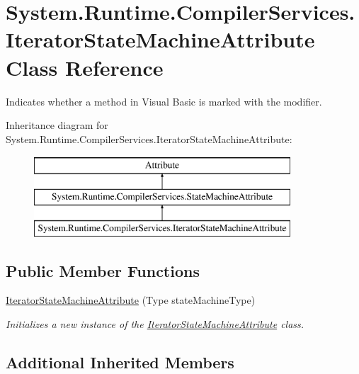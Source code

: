 \hypertarget{class_system_1_1_runtime_1_1_compiler_services_1_1_iterator_state_machine_attribute}{}\section{System.\+Runtime.\+Compiler\+Services.\+Iterator\+State\+Machine\+Attribute Class Reference}
\label{class_system_1_1_runtime_1_1_compiler_services_1_1_iterator_state_machine_attribute}


Indicates whether a method in Visual Basic is marked with the  modifier.  


Inheritance diagram for System.\+Runtime.\+Compiler\+Services.\+Iterator\+State\+Machine\+Attribute\+:\begin{figure}[H]
\begin{center}
\leavevmode
\includegraphics[height=3.000000cm]{class_system_1_1_runtime_1_1_compiler_services_1_1_iterator_state_machine_attribute}
\end{center}
\end{figure}
\subsection*{Public Member Functions}
\begin{DoxyCompactItemize}
\item 
\hyperlink{class_system_1_1_runtime_1_1_compiler_services_1_1_iterator_state_machine_attribute_a8ddc925d5ed452fad9d81ece8b580661}{Iterator\+State\+Machine\+Attribute} (Type state\+Machine\+Type)
\begin{DoxyCompactList}\small\item\em Initializes a new instance of the \hyperlink{class_system_1_1_runtime_1_1_compiler_services_1_1_iterator_state_machine_attribute}{Iterator\+State\+Machine\+Attribute} class. \end{DoxyCompactList}\end{DoxyCompactItemize}
\subsection*{Additional Inherited Members}


